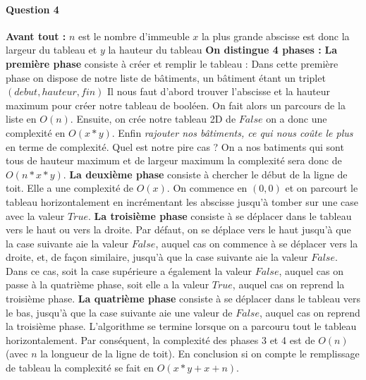 \documentclass[a4paper,10pt]{article}
\begin{document}
\paragraph{Question 4}
\textbf{Avant tout :} $n$ est le nombre d'immeuble $x$ la plus grande abscisse est donc la largeur du tableau et $y$ la hauteur du tableau\newline \newline
\textbf{On distingue 4 phases :} \newline \newline
\textbf{La première phase} consiste à créer et remplir le tableau :\newline
Dans cette première phase on dispose de notre liste de bâtiments, un bâtiment étant un triplet $(debut, hauteur, fin)$\newline
Il nous faut d'abord trouver l'abscisse et la hauteur maximum pour créer notre tableau de booléen. On fait alors un parcours de la liste en $O(n)$. 
Ensuite, on crée notre tableau 2D de $False$ on a donc une complexité en $O(x*y)$.
Enfin \emph{rajouter nos bâtiments, ce qui nous coûte le plus} en terme de complexité.
Quel est notre pire cas ? On a nos batiments qui sont tous de hauteur maximum et de largeur maximum la complexité sera donc de $O(n*x*y)$.\newline
\textbf{La deuxième phase} consiste à chercher le début de la ligne de toit. Elle a une complexité de $O(x)$. On commence en $(0,0)$ et 
on parcourt le tableau horizontalement en incrémentant les abscisse jusqu'à tomber sur une case avec la valeur $True$.\newline
\textbf{La troisième phase} consiste à se déplacer dans le tableau vers le haut ou vers la droite. Par défaut, on se déplace vers le haut jusqu'à que la case suivante aie la valeur $False$, 
auquel cas on commence à se déplacer vers la droite, et, de façon similaire, jusqu'à que la case suivante aie la valeur $False$. 
Dans ce cas, soit la case supérieure a également la valeur $False$, auquel cas on passe à la quatrième phase, soit elle a la valeur $True$, auquel cas on reprend la troisième phase.\newline
\textbf{La quatrième phase} consiste à se déplacer dans le tableau vers le bas, jusqu'à que la case suivante aie une valeur de $False$, auquel cas on reprend la troisième phase.\newline
L'algorithme se termine lorsque on a parcouru tout le tableau horizontalement.\newline
Par conséquent, la complexité des phases 3 et 4 est de $O(n)$ (avec $n$ la longueur de la ligne de toit).
En conclusion si on compte le remplissage de tableau la complexité se fait en $O(x*y + x + n)$.
\end{document}
